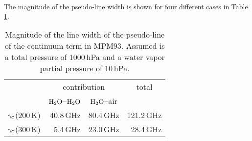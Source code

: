 %
The magnitude of the pseudo-line width is shown for four different 
cases in Table\,\ref{tab:mpm_psl_broad}. 
%
\begin{table}[!htb]
\begin{center}
\begin{tabular}{lrrr}
\hline
 & \multicolumn{2}{c}{contribution} & \multicolumn{1}{c}{total} \\
 & \multicolumn{1}{c}{$\mbox{H}_2\mbox{O}$--$\mbox{H}_2\mbox{O}$} & \multicolumn{1}{c}{$\mbox{H}_2\mbox{O}$--air} & \\
\hline
$\gamma_{\mbox{\rm \small c}}$(200\,K) & 40.8\,GHz & 80.4\,GHz & 121.2\,GHz\\
$\gamma_{\mbox{\rm \small c}}$(300\,K) &  5.4\,GHz & 23.0\,GHz &  28.4\,GHz\\
\hline
\end{tabular}
\caption[MPM93 parameters.]{Magnitude of the line width of the pseudo-line of the
  continuum term in MPM93. Assumed is a total pressure of 1000\,hPa
  and a water vapor partial pressure of 10\,hPa.}
\label{tab:mpm_psl_broad}
\end{center}
\end{table} 


